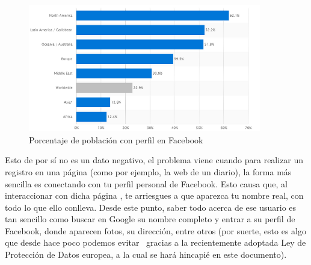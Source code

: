 \begin{figure}[h]
	\centerline{
		\mbox{\includegraphics[width=4.00in]{images/sn.png}}
	}
	\caption{Porcentaje de población con perfil en Facebook~\cite{article:FacebookStats} }
	\label{fig:FBStats}
\end{figure}

Esto de por sí no es un dato negativo, el problema viene cuando para
realizar un registro en una página (como por ejemplo, la web de un
diario), la forma más sencilla es conectando con tu perfil personal de
Facebook. Esto causa que, al interaccionar con dicha página , te
arriesgues a que aparezca tu nombre real, con todo lo que ello
conlleva. Desde este punto, saber todo acerca de ese usuario es tan
sencillo como buscar en Google su nombre completo y entrar a su perfil
de Facebook, donde aparecen fotos, su dirección, entre otros (por
suerte, esto es algo que desde hace poco podemos
evitar~\cite{article:GDPRGoogle} gracias a la recientemente adoptada
Ley de Protección de Datos europea,  a la cual se hará hincapié en este
documento).

